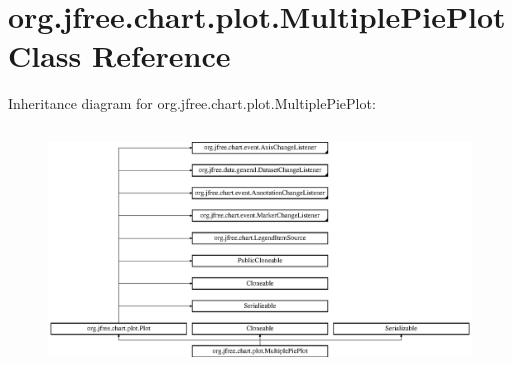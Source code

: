 \hypertarget{classorg_1_1jfree_1_1chart_1_1plot_1_1_multiple_pie_plot}{}\section{org.\+jfree.\+chart.\+plot.\+Multiple\+Pie\+Plot Class Reference}
\label{classorg_1_1jfree_1_1chart_1_1plot_1_1_multiple_pie_plot}
Inheritance diagram for org.\+jfree.\+chart.\+plot.\+Multiple\+Pie\+Plot\+:\begin{figure}[H]
\begin{center}
\leavevmode
\includegraphics[height=6.436782cm]{classorg_1_1jfree_1_1chart_1_1plot_1_1_multiple_pie_plot}
\end{center}
\end{figure}
